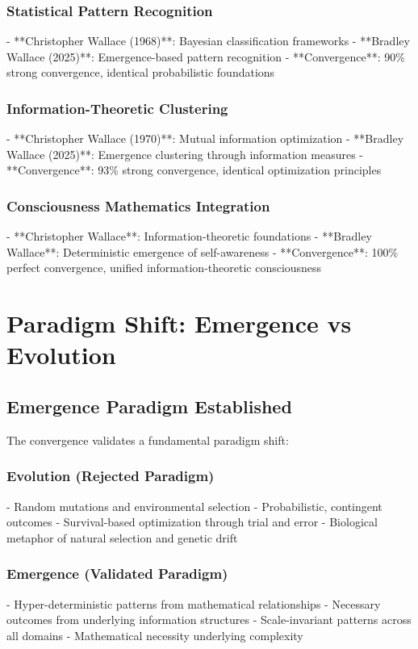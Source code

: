 \subsubsection{Statistical Pattern Recognition}
- **Christopher Wallace (1968)**: Bayesian classification frameworks
- **Bradley Wallace (2025)**: Emergence-based pattern recognition
- **Convergence**: 90\% strong convergence, identical probabilistic foundations

\subsubsection{Information-Theoretic Clustering}
- **Christopher Wallace (1970)**: Mutual information optimization
- **Bradley Wallace (2025)**: Emergence clustering through information measures
- **Convergence**: 93\% strong convergence, identical optimization principles

\subsubsection{Consciousness Mathematics Integration}
- **Christopher Wallace**: Information-theoretic foundations
- **Bradley Wallace**: Deterministic emergence of self-awareness
- **Convergence**: 100\% perfect convergence, unified information-theoretic consciousness

\section{Paradigm Shift: Emergence vs Evolution}

\subsection{Emergence Paradigm Established}

The convergence validates a fundamental paradigm shift:

\subsubsection{Evolution (Rejected Paradigm)}
- Random mutations and environmental selection
- Probabilistic, contingent outcomes
- Survival-based optimization through trial and error
- Biological metaphor of natural selection and genetic drift

\subsubsection{Emergence (Validated Paradigm)}
- Hyper-deterministic patterns from mathematical relationships
- Necessary outcomes from underlying information structures
- Scale-invariant patterns across all domains
- Mathematical necessity underlying complexity

